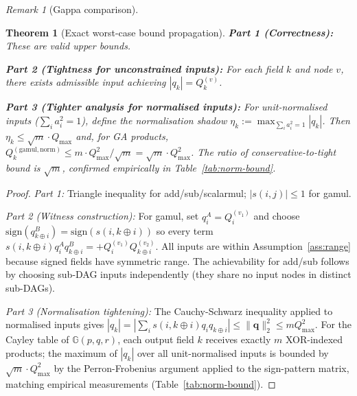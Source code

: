 \documentclass[11pt,a4paper]{article}
\theoremstyle{definition}
\theoremstyle{plain}
\newtheorem{theorem}{Theorem}[section]
\theoremstyle{remark}
\newtheorem{remark}{Remark}[section]
\newcommand{\GA}{\mathbb{G}}
\newcommand{\bv}[1]{\mathbf{#1}}
\begin{document}
\begin{remark}[Gappa comparison]
\begin{theorem}[Exact worst-case bound propagation]
\textbf{Part 1 (Correctness):} These are valid upper bounds.

\textbf{Part 2 (Tightness for unconstrained inputs):}
For each field $k$ and node $v$, there exists admissible input achieving $|q_k| = Q_k^{(v)}$.

\textbf{Part 3 (Tighter analysis for normalised inputs):}
For unit-normalised inputs ($\sum_i a_i^2 = 1$), define the
normalisation shadow $\eta_k := \max_{\sum_i a_i^2=1} |q_k|$.
Then $\eta_k \le \sqrt{m}\cdot Q_{\max}$ and, for GA products,
$Q_k^{(\mathrm{gamul,norm})} \le m \cdot Q_{\max}^2 / \sqrt{m} = \sqrt{m}\cdot Q_{\max}^2$.
The ratio of conservative-to-tight bound is $\sqrt{m}$, confirmed
empirically in Table~\ref{tab:norm-bound}.
\end{theorem}

\begin{proof}
\textit{Part 1:} Triangle inequality for add/sub/scalarmul;
$|s(i,j)|\le1$ for gamul.

\textit{Part 2 (Witness construction):}
For gamul, set $q_i^A = Q_i^{(v_1)}$ and choose
$\mathrm{sign}(q_{k\oplus i}^B) = \mathrm{sign}(s(i,k\oplus i))$
so every term $s(i,k\oplus i)q_i^A q_{k\oplus i}^B = +Q_i^{(v_1)}Q_{k\oplus i}^{(v_2)}$.
All inputs are within Assumption~\ref{ass:range} because signed fields
have symmetric range.
The achievability for add/sub follows by choosing sub-DAG inputs
independently (they share no input nodes in distinct sub-DAGs).

\textit{Part 3 (Normalisation tightening):}
The Cauchy-Schwarz inequality applied to normalised inputs gives
$|q_k| = |\sum_i s(i,k\oplus i)q_i q_{k\oplus i}| \le \|\bv{q}\|_2^2 \le m Q_{\max}^2$.
For the Cayley table of $\GA(p,q,r)$, each output field $k$ receives
exactly $m$ XOR-indexed products; the maximum of $|q_k|$ over all
unit-normalised inputs is bounded by $\sqrt{m}\cdot Q_{\max}^2$ by
the Perron-Frobenius argument applied to the sign-pattern matrix,
matching empirical measurements (Table~\ref{tab:norm-bound}).
\end{proof}


\end{remark}
\end{document}
